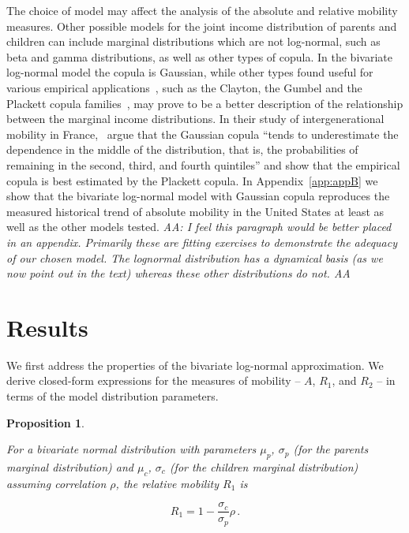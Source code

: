 \documentclass[12pt,a4paper]{article}
\newtheorem{proposition}{Proposition}
\newcommand{\red}[1]{{\color{red} #1}}
\newcommand{\elabel}[1]{\label{eq:#1}}
\newcommand{\AAA}[1]{\red{{\it AA: #1 AA}}}
\newcommand{\be}{\begin{equation}}
\newcommand{\ee}{\end{equation}}
\numberwithin{equation}{section}
\begin{document}
The choice of model may affect the analysis of the absolute and relative mobility measures. Other possible models for the joint income distribution of parents and children can include marginal distributions which are not log-normal, such as beta and gamma distributions, as well as other types of copula. In the bivariate log-normal model the copula is Gaussian, while other types found useful for various empirical applications~\citep{trivedi2007copula}, such as the Clayton, the Gumbel and the Plackett copula families~\citep{bonhomme2009assessing}, may prove to be a better description of the relationship between the marginal income distributions. In their study of intergenerational mobility in France,~\citet{bonhomme2009assessing} argue that the Gaussian copula ``tends to underestimate the dependence in the middle of the distribution, that is, the probabilities of remaining in the second, third, and fourth quintiles'' and show that the empirical copula is best estimated by the Plackett copula. In Appendix~\ref{app:appB} we show that the bivariate log-normal model with Gaussian copula reproduces the measured historical trend of absolute mobility in the United States at least as well as the other models tested. \AAA{I feel this paragraph would be better placed in an appendix. Primarily these are fitting exercises to demonstrate the adequacy of our chosen model. The lognormal distribution has a dynamical basis (as we now point out in the text) whereas these other distributions do not.}

\section{Results}
\label{sec:results}

We first address the properties of the bivariate log-normal approximation. We derive closed-form expressions for the measures of mobility -- $A$, $R_1$, and $R_2$ -- in terms of the model distribution parameters.

\begin{proposition}
\label{prop:prop1}

For a bivariate normal distribution with parameters $\mu_p$, $\sigma_p$ (for the parents marginal distribution) and $\mu_c$, $\sigma_c$ (for the children marginal distribution) assuming correlation $\rho$, the relative mobility $R_1$ is

\be
R_1 = 1-\frac{\sigma_c}{\sigma_p}\rho \,.
\elabel{beta_rho}
\ee
\end{proposition}
\end{document}
